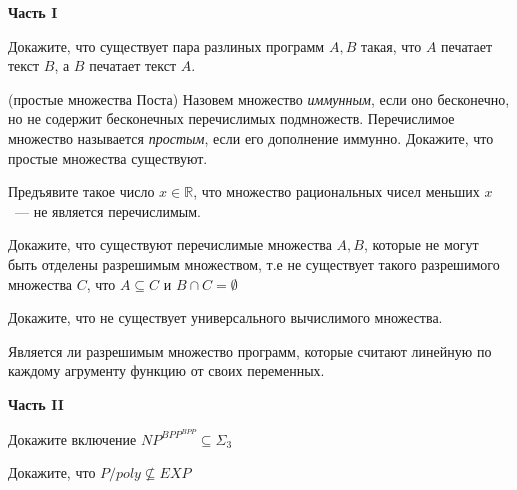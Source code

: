\setcounter{curtask}{1}

\begin{center}
    \textbf{Часть I}
\end{center}

\begin{task}
    Докажите, что существует пара разлиных программ $A, B$ такая, что $A$ печатает текст $B$, а $B$ печатает текст $A$.
\end{task}

\begin{task} (простые множества Поста)
    Назовем множество {\it иммунным}, если оно бесконечно, но не
    содержит бесконечных перечислимых подмножеств. Перечислимое
    множество называется {\it простым}, если его дополнение иммунно.
    Докажите, что простые множества существуют.
\end{task}

\begin{task}
    Предъявите такое число $x \in \mathbb{R}$, что множество рациональных чисел меньших $x$~--- не является перечислимым.
\end{task}

\begin{task}
    Докажите, что существуют перечислимые множества $A, B$, которые не
    могут быть отделены разрешимым множеством, т.е не существует
    такого разрешимого множества $C$, что $A \subseteq C$ и $B \cap C
    = \emptyset$
\end{task}

\begin{task}
    Докажите, что не существует универсального вычислимого множества.
\end{task}

\begin{task}
    Является ли разрешимым множество программ, которые считают линейную по каждому агрументу функцию от своих переменных.
\end{task}




\begin{center}
    \textbf{Часть II}
\end{center}


\begin{task}
    Докажите включение $NP^{BPP}^{BPP} \subseteq \Sigma_3$
\end{task}

\begin{task}
    Докажите, что $P/poly \nsubseteq EXP$
\end{task}

